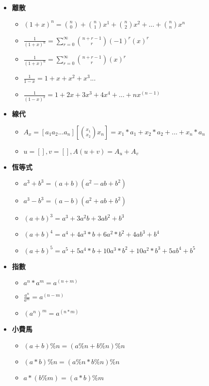 \begin{itemize}
  \item \textbf{離散}
  \begin{itemize}
    \item $(1+x)^n = \binom{n}{0} + \binom{n}{1}x^1 + \binom{n}{2}x^2 + ... + \binom{n}{n}x^n$
    \item $\frac{1}{(1+x)^n} = \sum \limits_{r=0}^\infty \binom{n+r-1}{r}(-1)^r(x)^r$
    \item $\frac{1}{(1+x)^n} = \sum \limits_{r=0}^\infty \binom{n+r-1}{r}(x)^r$
    \item $\frac{1}{1-x} = 1+x+x^2+x^3...$
    \item $\frac{1}{(1-x)^2} = 1+2x+3x^3+4x^4+...+nx^(n-1)$
  \end{itemize}

  \item \textbf{線代}
  \begin{itemize}
    \item $A_x = [a_1 a_2 ... a_n][\binom{x_1}{x_2}{x_n}] = x_1*a_1+x_2*a_2+...+x_n*a_n$
    \item $u=[], v=[], A(u+v) = A_u+A_v$
  \end{itemize}

  \item \textbf{恆等式}
  \begin{itemize}
    \item $a^3+b^3 = (a+b)(a^2-ab+b^2)$
    \item $a^3-b^3 = (a-b)(a^2+ab+b^2)$
    \item $(a+b)^3 = a^3+3a^2b+3ab^2+b^3$
    \item $(a+b)^4 = a^4+4a^3*b+6a^2*b^2+4ab^3+b^4$
    \item $(a+b)^5 = a^5+5a^4*b+10a^3*b^2+10a^2*b^3+5ab^4+b^5$
  \end{itemize}

  \item \textbf{指數}
  \begin{itemize}
    \item $a^n*a^m = a^(n+m)$
    \item $\frac{a^n}{a^m} = a^(n-m)$
    \item $(a^n)^m = a^(n*m)$
  \end{itemize}

  
  \item \textbf{小費馬}
  \begin{itemize}
    \item $(a+b)\%n = (a\%n+b\%n)\%n$
    \item $(a*b)\%n = (a\%n*b\%n)\%n$
    \item $a*(b\%m) = (a*b)\%m$
  \end{itemize}
\end{itemize}
